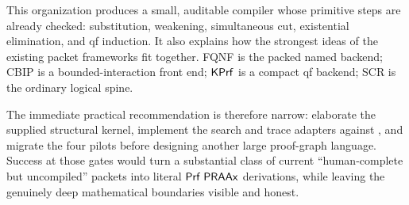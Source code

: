 This organization produces a small, auditable compiler whose primitive steps
are already checked: substitution, weakening, simultaneous cut, existential
elimination, and qf induction.  It also explains how the strongest ideas of the
existing packet frameworks fit together.  FQNF is the packed named backend;
CBIP is a bounded-interaction front end; \(\mathsf{KPrf}\) is a compact qf backend;
SCR is the ordinary logical spine.

The immediate practical recommendation is therefore narrow: elaborate the
supplied structural kernel, implement the search and trace adapters against
, and migrate the four pilots before designing another
large proof-graph language.  Success at those gates would turn a substantial
class of current ``human-complete but uncompiled'' packets into literal
\(\mathsf{Prf}\;\mathsf{PRAAx}\) derivations, while leaving the genuinely deep mathematical
boundaries visible and honest.
